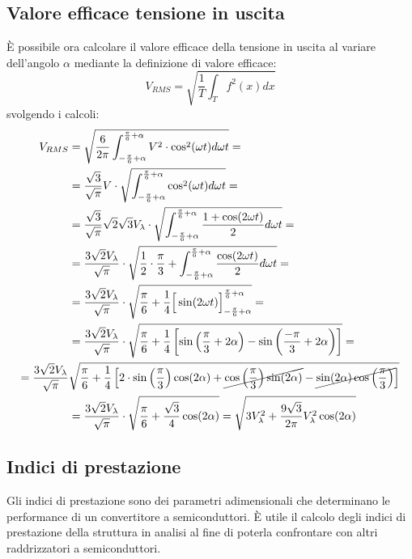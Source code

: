 \documentclass[a4paper,11pt]{article}
\begin{document}
\subsection{Valore efficace tensione in uscita}
È possibile ora calcolare il valore efficace della tensione in uscita al variare 
dell'angolo \(\alpha\) mediante la definizione di valore efficace:
\begin{equation}
V_{RMS} = \sqrt{\frac{1}{T}\int_T f^2(x)dx}
\end{equation}
svolgendo i calcoli:
\begin{align*}
V_{RMS} &= \sqrt{\frac{6}{2\pi}\int_{-\frac{\pi}{6}+\alpha}^{\frac{\pi}{6}+\alpha}V^2\cdot \cos^2(\omega t) d\omega t  } = \\
&= \frac{\sqrt{3}}{\sqrt{\pi}}V \cdot \sqrt{\int_{-\frac{\pi}{6}+\alpha}^{\frac{\pi}{6}+\alpha} \cos^2(\omega t) d\omega t  } = \\
&= \frac{\sqrt{3}}{\sqrt{\pi}}\sqrt{2} \sqrt{3} V_\lambda\cdot \sqrt{\int_{-\frac{\pi}{6}+\alpha}^{\frac{\pi}{6}+\alpha} \frac{1+\cos(2\omega t)}{2}d\omega t } = \\
&= \frac{3\sqrt{2}V_{\lambda}}{\sqrt{\pi}}\cdot \sqrt{\frac{1}{2}\cdot\frac{\pi}{3} + \int_{-\frac{\pi}{6}+\alpha}^{\frac{\pi}{6}+\alpha} \frac{\cos(2\omega t)}{2}d\omega t } =\\
&= \frac{3\sqrt{2}V_{\lambda}}{\sqrt{\pi}}\cdot \sqrt{ \frac{\pi}{6} +\frac{1}{4}\Big[\sin(2\omega t)\Big]_{-\frac{\pi}{6}+\alpha}^{\frac{\pi}{6}+\alpha} } =\\
&= \frac{3\sqrt{2}V_{\lambda}}{\sqrt{\pi}}\cdot \sqrt{\frac{\pi}{6} + \frac{1}{4}\left[\sin\left(\frac{\pi}{3}+2\alpha\right) - \sin\left(\frac{-\pi}{3}+2\alpha\right)\right] }= \\
= \frac{3\sqrt{2}V_{\lambda}}{\sqrt{\pi}}&\sqrt{\frac{\pi}{6} + \frac{1}{4}\left[2\cdot\sin\left(\frac{\pi}{3}\right)\cos(2\alpha) + \cancel{\cos\left(\frac{\pi}{3}\right)\sin(2\alpha)} -\cancel{\sin(2\alpha)\cos\left(\frac{\pi}{3}\right)} \right]  }\\
&=\frac{3\sqrt{2}V_{\lambda}}{\sqrt{\pi}}\cdot \sqrt{\frac{\pi}{6} + \frac{\sqrt{3}}{4}\cos(2\alpha) } = \sqrt{3V_\lambda^2 + \frac{9\sqrt{3}}{2\pi}V_\lambda^2\cos(2\alpha)}
\end{align*}

\subsection{Indici di prestazione}
Gli indici di prestazione sono dei parametri adimensionali che determinano le
performance di un convertitore a semiconduttori.
È utile il calcolo degli indici di prestazione della struttura in analisi al fine di 
poterla confrontare con altri raddrizzatori a semiconduttori.
\end{document}
